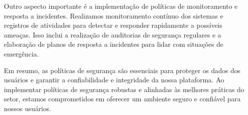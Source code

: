 Outro aspecto importante é a implementação de políticas de monitoramento e resposta a incidentes. Realizamos monitoramento contínuo dos sistemas e registros de atividades para detectar e responder rapidamente a possíveis ameaças. Isso inclui a realização de auditorias de segurança regulares e a elaboração de planos de resposta a incidentes para lidar com situações de emergência.

Em resumo, as políticas de segurança são essenciais para proteger os dados dos usuários e garantir a confiabilidade e integridade da nossa plataforma. Ao implementar políticas de segurança robustas e alinhadas às melhores práticas do setor, estamos comprometidos em oferecer um ambiente seguro e confiável para nossos usuários.